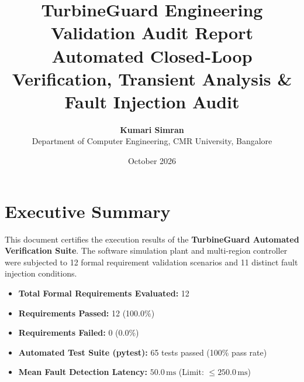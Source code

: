 \documentclass[11pt,a4paper]{article}
\title{\textbf{TurbineGuard Engineering Validation Audit Report}\\
\large Automated Closed-Loop Verification, Transient Analysis \& Fault Injection Audit}
\author{\textbf{Kumari Simran}\\
Department of Computer Engineering, CMR University, Bangalore}
\date{October 2026}
\begin{document}
\maketitle

\section{Executive Summary}
This document certifies the execution results of the \textbf{TurbineGuard Automated Verification Suite}. The software simulation plant and multi-region controller were subjected to 12 formal requirement validation scenarios and 11 distinct fault injection conditions.
\begin{itemize}
    \item \textbf{Total Formal Requirements Evaluated:} 12
    \item \textbf{Requirements Passed:} 12 (100.0\%)
    \item \textbf{Requirements Failed:} 0 (0.0\%)
    \item \textbf{Automated Test Suite (pytest):} 65 tests passed (100\% pass rate)
    \item \textbf{Mean Fault Detection Latency:} $50.0\,\text{ms}$ (Limit: $\le 250.0\,\text{ms}$)
\end{itemize}
\end{document}
